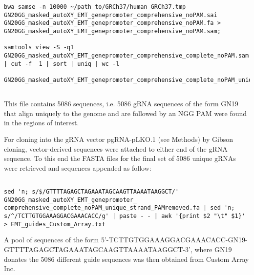 \begin{footnotesize}
\begin{lstlisting}
bwa samse -n 10000 ~/path_to/GRCh37/human_GRCh37.tmp   
GN20GG_masked_autoXY_EMT_genepromoter_comprehensive_noPAM.sai 
GN20GG_masked_autoXY_EMT_genepromoter_comprehensive_noPAM.fa > 
GN20GG_masked_autoXY_EMT_genepromoter_comprehensive_noPAM.sam;

samtools view -S -q1 
GN20GG_masked_autoXY_EMT_genepromoter_comprehensive_complete_noPAM.sam | cut -f  1 | sort | uniq | wc -l

GN20GG_masked_autoXY_EMT_genepromoter_comprehensive_complete_noPAM_unique_strand.bed


\end{lstlisting}

This file contains 5086 sequences, i.e. 5086 gRNA sequences of the form GN19 that align uniquely to the genome and are followed by an NGG PAM were found in the regions of interest.

For cloning into the gRNA vector pgRNA-pLKO.1 (see Methods) by Gibson cloning, vector-derived sequences were attached to either end of the gRNA sequence. To this end the FASTA files for the final set of 5086 unique gRNAs were retrieved and sequences appended as follow:

\begin{lstlisting}

sed 'n; s/$/GTTTTAGAGCTAGAAATAGCAAGTTAAAATAAGGCT/' GN20GG_masked_autoXY_EMT_genepromoter_ comprehensive_complete_noPAM_unique_strand_PAMremoved.fa | sed 'n; s/^/TCTTGTGGAAAGGACGAAACACC/g' | paste - - | awk '{print $2 "\t" $1}' > EMT_guides_Custom_Array.txt

\end{lstlisting}


A pool of sequences of the form 5'-TCTTGTGGAAAGGACGAAACACC-GN19-GTTTTAGAGCTAGAAATAGCAAGTTAAAATAAGGCT-3', where GN19 donates the 5086 different guide sequences was then obtained from Custom Array Inc. 


\end{footnotesize}
